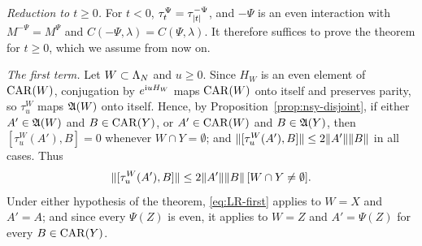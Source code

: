\emph{Reduction to $t\ge0$.} For $t<0$, $\tau^\Psi_t=\tau^{-\Psi}_{\lvert t\rvert}$, and $-\Psi$ is an even interaction with
$M^{-\Psi}=M^\Psi$ and $C(-\Psi,\lambda)=C(\Psi,\lambda)$. It therefore suffices to prove the theorem for $t\ge0$, which we
assume from now on.

\emph{The first term.} Let $W\subset\Lambda_N$ and $u\ge0$. Since $H_W$ is an even element of $\mathrm{CAR}(W)$, conjugation by
$e^{\mathrm{i} uH_W}$ maps $\mathrm{CAR}(W)$ onto itself and preserves parity, so $\tau^W_u$ maps $\mathfrak{A}(W)$ onto itself. Hence, by
Proposition~\ref{prop:nsy-disjoint}, if either $A'\in\mathfrak{A}(W)$ and $B\in\mathrm{CAR}(Y)$, or $A'\in\mathrm{CAR}(W)$ and $B\in\mathfrak{A}(Y)$, then
$[\tau^W_u(A'),B]=0$ whenever $W\cap Y=\emptyset$; and $\lVert[\tau^W_u(A'),B]\rVert\le2\lVert A'\rVert\lVert B\rVert$ in all cases.
Thus
\begin{equation}\label{eq:LR-first}
\lVert[\tau^W_u(A'),B]\rVert\le2\lVert A'\rVert\lVert B\rVert\,[W\cap Y\ne\emptyset].
\end{equation}
Under either hypothesis of the theorem, \eqref{eq:LR-first} applies to $W=X$ and $A'=A$; and since every $\Psi(Z)$ is
even, it applies to $W=Z$ and $A'=\Psi(Z)$ for every $B\in\mathrm{CAR}(Y)$.

